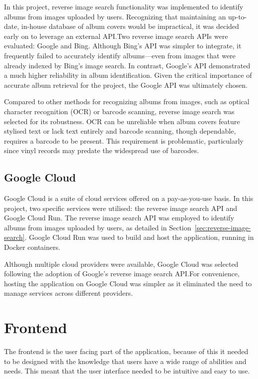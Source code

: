 In this project, reverse image search functionality was implemented to identify albums from images uploaded by users. Recognizing that maintaining an up-to-date, in-house database of album covers would be impractical, it was decided early on to leverage an external API.\@ Two reverse image search APIs were evaluated: Google and Bing. Although Bing's API was simpler to integrate, it frequently failed to accurately identify albums—even from images that were already indexed by Bing's image search. In contrast, Google's API demonstrated a much higher reliability in album identification. Given the critical importance of accurate album retrieval for the project, the Google API was ultimately chosen.

Compared to other methods for recognizing albums from images, such as optical character recognition (OCR) or barcode scanning, reverse image search was selected for its robustness. OCR can be unreliable when album covers feature stylised text or lack text entirely and barcode scanning, though dependable, requires a barcode to be present. This requirement is problematic, particularly since vinyl records may predate the widespread use of barcodes.

\subsection{Google Cloud}
Google Cloud is a suite of cloud services offered on a pay-as-you-use basis. In this project, two specific services were utilised: the reverse image search API and Google Cloud Run. The reverse image search API was employed to identify albums from images uploaded by users, as detailed in Section~\ref{sec:reverse-image-search}. Google Cloud Run was used to build and host the application, running in Docker containers.

Although multiple cloud providers were available, Google Cloud was selected following the adoption of Google's reverse image search API.\@ For convenience, hosting the application on Google Cloud was simpler as it eliminated the need to manage services across different providers.

\section{Frontend}
The frontend is the user facing part of the application, because of this it needed to be designed with the knowledge that users have a wide range of abilities and needs. This meant that the user interface needed to be intuitive and easy to use.

